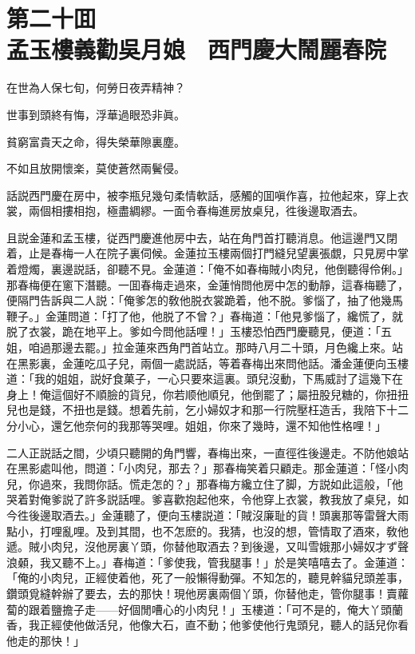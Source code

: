 
\chapter*{第二十囬　\\孟玉樓義勸吳月娘　西門慶大鬧麗春院}


\begin{myquote}
在世為人保七旬，何勞日夜弄精神？

世事到頭終有悔，浮華過眼恐非眞。

貧窮富貴天之命，得失榮華隙裏塵。

不如且放開懷楽，莫使蒼然兩鬢侵。
\end{myquote}

話説西門慶在房中，被李瓶兒幾句柔情軟話，感觸的囬嗔作喜，拉他起來，穿上衣裳，兩個相摟相抱，極盡綢繆。一面令春梅進房放桌兒，徃後邊取酒去。

且説金蓮和孟玉樓，従西門慶進他房中去，站在角門首打聽消息。他這邊門又閉着，止是春梅一人在院子裏伺候。金蓮拉玉樓兩個打門縫兒望裏張覷，只見房中掌着燈燭，裏邊説話，卻聽不見。金蓮道：「俺不如春梅賊小肉兒，他倒聽得伶俐。」那春梅便在窻下潛聽。一囬春梅走過來，金蓮悄問他房中怎的動靜，這春梅聽了，便隔門告訴與二人説：「俺爹怎的敎他脱衣裳跪着，他不脱。爹惱了，抽了他幾馬鞭子。」金蓮問道：「打了他，他脱了不曾？」春梅道：「他見爹惱了，纔慌了，就脱了衣裳，跪在地平上。爹如今問他話哩！」玉樓恐怕西門慶聽見，便道：「五姐，咱過那邊去罷。」拉金蓮來西角門首站立。那時八月二十頭，月色纔上來。站在黑影裏，金蓮吃瓜子兒，兩個一處説話，等着春梅出來問他話。潘金蓮便向玉樓道：「我的姐姐，説好食菓子，一心只要來這裏。頭兒沒動，下馬威討了這幾下在身上！俺這個好不順臉的貨兒，你若顺他順兒，他倒罷了；屬扭股兒糖的，你扭扭兒也是錢，不扭也是錢。想着先前，乞小婦奴才和那一行院壓枉造舌，我陪下十二分小心，還乞他奈何的我那等哭哩。姐姐，你來了幾時，還不知他性格哩！」

二人正説話之間，少頃只聽開的角門響，春梅出來，一直徑徃後邊走。不防他娘站在黑影處叫他，問道：「小肉兒，那去？」那春梅笑着只顧走。那金蓮道：「怪小肉兒，你過來，我問你話。慌走怎的？」那春梅方纔立住了脚，方説如此這般，「他哭着對俺爹説了許多説話哩。爹喜歡抱起他來，令他穿上衣裳，教我放了桌兒，如今徃後邊取酒去。」金蓮聽了，便向玉樓説道：「賊沒廉耻的貨！頭裏那等雷聲大雨點小，打哩亂哩。及到其間，也不怎麽的。我猜，也沒的想，管情取了酒來，敎他遞。賊小肉兒，沒他房裏丫頭，你替他取酒去？到後邊，又叫雪娥那小婦奴才ず聲浪顙，我又聽不上。」春梅道：「爹使我，管我腿事！」於是笑嘻嘻去了。金蓮道：「俺的小肉兒，正經使着他，死了一般懶得動彈。不知怎的，聽見幹貓兒頭差事，鑽頭覓縫幹辦了要去，去的那快！現他房裏兩個丫頭，你替他走，管你腿事！賣蘿蔔的跟着鹽擔子走——好個閒嘈心的小肉兒！」玉樓道：「可不是的，俺大丫頭蘭香，我正經使他做活兒，他像大石，直不動；他爹使他行鬼頭兒，聽人的話兒你看他走的那快！」

